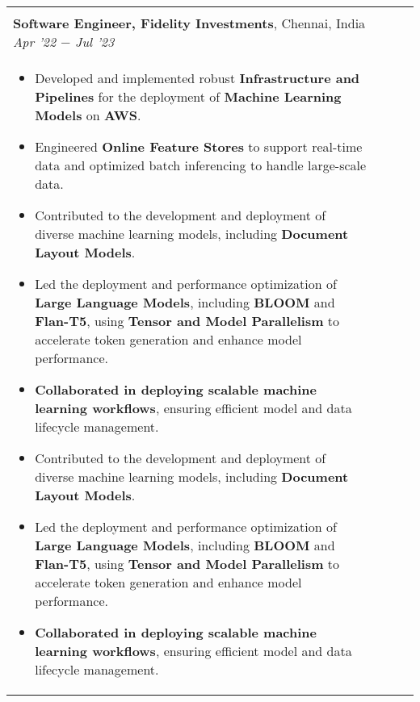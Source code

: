 \documentclass[10pt,a4]{article}
\begin{document}
{\begin{tabu}
\begin{center}
\begin{tabular} {p{} p{} p{} p{}}
\begin{flushleft}
    
    \vspace{0.5mm}
    \hspace{1.5mm} \textbf{\large Software Engineer, Fidelity Investments},  Chennai, India \hfill \textit{\large Apr '22 $-$ Jul '23}	\\
    \hspace{1.5mm} \textbf{\large Software Engineer, Fidelity Investments},  Chennai, India \hfill \textit{\large Apr '22 $-$ Jul '23}	\\
    \begin{itemize}
        \item Developed and implemented robust \textbf{Infrastructure and Pipelines} for the deployment of \textbf{Machine Learning Models} on \textbf{AWS}.  
         \item Engineered \textbf{Online Feature Stores} to support real-time data and optimized batch inferencing to handle large-scale data.
         \item Contributed to the development and deployment of diverse machine learning models, including \textbf{Document Layout Models}.
         \item Led the deployment and performance optimization of \textbf{Large Language Models}, including \textbf{BLOOM} and \textbf{Flan-T5}, using \textbf{Tensor and Model Parallelism} to accelerate token generation and enhance model performance.
        \item \textbf{Collaborated in deploying scalable machine learning workflows}, ensuring efficient model and data lifecycle management.
         \item Contributed to the development and deployment of diverse machine learning models, including \textbf{Document Layout Models}.
         \item Led the deployment and performance optimization of \textbf{Large Language Models}, including \textbf{BLOOM} and \textbf{Flan-T5}, using \textbf{Tensor and Model Parallelism} to accelerate token generation and enhance model performance.
        \item \textbf{Collaborated in deploying scalable machine learning workflows}, ensuring efficient model and data lifecycle management.
    \end{itemize}	
    

\end{flushleft}
\end{tabular}
\end{center}
\end{tabu}}
\end{document}

